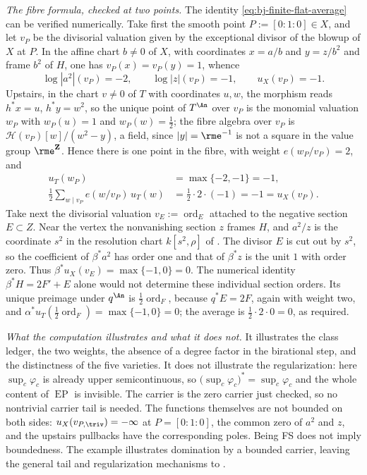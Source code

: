 \begin{example}
\emph{The fibre formula, checked at two points.}
The identity \eqref{eq:bj-finite-flat-average} can be verified numerically.
Take first the smooth point $P:=[0:1:0]\in X$, and let $v_P$ be the
divisorial valuation given by the exceptional divisor of the blowup of $X$
at $P$.  In the affine chart $b\ne0$ of $X$, with coordinates
$x=a/b$ and $y=z/b^2$ and frame $b^2$ of $H$, one has $v_P(x)=v_P(y)=1$,
whence
\[
 \log|a^2|(v_P)=-2,\qquad \log|z|(v_P)=-1,\qquad u_X(v_P)=-1 .
\]
Upstairs, in the chart $v\ne0$ of $T$ with coordinates $u,w$, the
morphism reads $h^*x=u$, $h^*y=w^2$, so the unique point of $T^{\An}$
over $v_P$ is the monomial valuation $w_P$ with
$w_P(u)=1$ and $w_P(w)=\tfrac12$; the fibre algebra over $v_P$ is
$\mathcal H(v_P)[w]/(w^2-y)$, a field, since $|y|=\rme^{-1}$ is not a
square in the value group $\rme^{\mathbf Z}$.  Hence there is one point in
the fibre, with weight $e(w_P/v_P)=2$, and
\[
 \begin{aligned}
  u_T(w_P)&=\max\{-2,-1\}=-1,\\
  \tfrac12\sum_{w\mid v_P}e(w/v_P)\,u_T(w)
   &=\tfrac12\cdot2\cdot(-1)=-1=u_X(v_P).
 \end{aligned}
\]
Take next the divisorial valuation $v_E:=\operatorname{ord}_E$ attached to
the negative section $E\subset Z$.  Near the vertex the nonvanishing
section $z$ frames $H$, and $a^2/z$ is the coordinate $s^2$ in the
resolution chart $k[s^2,\rho]$ of
.  The divisor $E$ is cut out by $s^2$,
so the coefficient of $\beta^*a^2$ has order one and that of
$\beta^*z$ is the unit $1$ with order zero.
Thus $\beta^*u_X(v_E)=\max\{-1,0\}=0$.
The numerical identity $\beta^*H=2F'+E$ alone would not determine
these individual section orders.
Its unique preimage under $q^{\An}$ is $\tfrac12\operatorname{ord}_F$,
because $q^*E=2F$, again with weight two, and
$\alpha^*u_T(\tfrac12\operatorname{ord}_F)=\max\{-1,0\}=0$; the average is
$\tfrac12\cdot2\cdot0=0$, as required.

\emph{What the computation illustrates and what it does not.}
It illustrates the class ledger, the two weights, the absence of a degree
factor in the birational step, and the distinctness of the five varieties.
It does not illustrate the regularization: here
$\sup_c\varphi_c$ is already upper semicontinuous, so
$\bigl(\sup_c\varphi_c\bigr)^*=\sup_c\varphi_c$ and the whole content of
$\operatorname{EP}$ is invisible.  The carrier is the zero carrier just checked, so no nontrivial carrier
tail is needed.  The functions themselves are not bounded on both sides:
$u_X(v_{P,\triv})=-\infty$ at $P=[0:1:0]$, the common zero of
$a^2$ and $z$, and the upstairs pullbacks have the corresponding poles.
Being FS does not imply boundedness.  The example illustrates domination
by a bounded carrier, leaving the general tail and regularization
mechanisms to .
\end{example}

